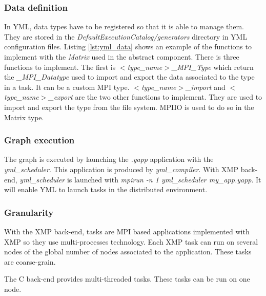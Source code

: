 \begin{figure}

\end{figure}

\subsubsection{Data definition}
In YML, data types have to be registered so that it is able to manage them.
They are stored in the \textit{DefaultExecutionCatalog/generators} directory in YML configuration files.
Listing \ref{lst:yml_data} shows an example of the functions to implement with the \textit{Matrix} used in the abstract component.
There is three functions to implement.
The first is \textit{$<$type\_name$>$\_MPI\_Type} which return the \textit{\_MPI\_Datatype} used to import and export the data associated to the type in a task.
It can be a custom MPI type.
\textit{$<$type\_name$>$\_import} and \textit{$<$type\_name$>$\_export} are the two other functions to implement.
They are used to import and export the type from the file system.
MPIIO is used to do so in the Matrix type.

\begin{figure}

\end{figure}

\subsubsection{Graph execution}
The graph is executed by launching the \textit{.yapp} application with the \textit{yml\_scheduler}.
This application is produced by \textit{yml\_compiler}.
With XMP back-end, \textit{yml\_scheduler} is launched with \textit{mpirun -n 1 yml\_scheduler my\_app.yapp}.
It will enable YML to launch tasks in the distributed environment.

\subsubsection{Granularity}
With the XMP back-end, tasks are MPI based applications implemented with XMP so they use multi-processes technology.
Each XMP task can run on several nodes of the global number of nodes associated to the application.
These tasks are coarse-grain.

The C back-end provides multi-threaded tasks.
These tasks can be run on one node.

